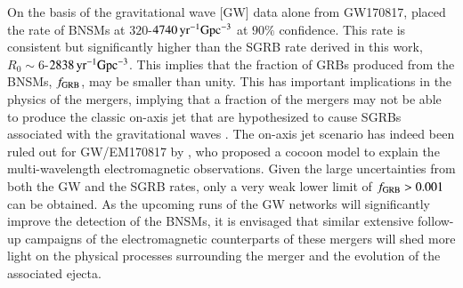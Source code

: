 On the basis of the gravitational wave [GW] data alone from GW170817, \cite{GW170817-2017} placed the rate of BNSMs at $320$-$4740 \, {\rm yr^{-1}Gpc^{-3}} $ at $90\%$ confidence. This rate is consistent but significantly higher than the SGRB rate derived in this work, $R_0 \sim 6 $-$ 2838 \, {\rm yr^{-1}Gpc^{-3}} $. This implies that the fraction of GRBs produced from the BNSMs, $f_{{\rm GRB}}$, may be smaller than unity. This has important implications in the physics of the mergers, implying that a fraction of the mergers may not be able to produce the classic on-axis jet that are hypothesized to cause SGRBs associated with the gravitational waves \citep{Narayan_et_al.-1992-ApJ}. The on-axis jet scenario has indeed been ruled out for GW/EM170817 by \cite{Kasliwal_et_al.-2017-Science}, who proposed a cocoon model to explain the multi-wavelength electromagnetic observations. Given the large uncertainties from both the GW and the SGRB rates, only a very weak lower limit of $f_{{\rm GRB}} > 0.001$ can be obtained. As the upcoming runs of the GW networks will significantly improve the detection of the BNSMs, it is envisaged that similar extensive follow-up campaigns of the electromagnetic counterparts of these mergers will shed more light on the physical processes surrounding the merger and the evolution of the associated ejecta.


